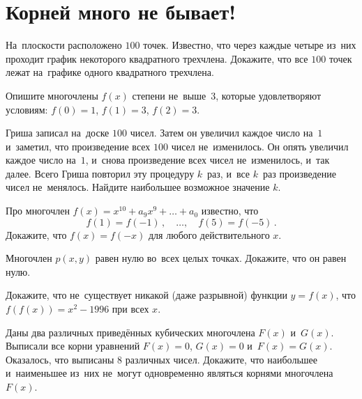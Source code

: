 
\section*{Корней много не бывает!}


\begin{problems}

\item
На~плоскости расположено $100$ точек.
Известно, что через каждые четыре из~них проходит график некоторого квадратного
трехчлена.
Докажите, что все $100$ точек лежат на~графике одного квадратного трехчлена.

\item
Опишите многочлены $f(x)$ степени не~выше~$3$, которые удовлетворяют условиям:
$f(0) = 1$, $f(1) = 3$, $f(2) = 3$.

\item
Гриша записал на~доске $100$ чисел.
Затем он увеличил каждое число на~$1$ и~заметил, что произведение всех $100$
чисел не~изменилось.
Он опять увеличил каждое число на~$1$, и~снова произведение всех чисел
не~изменилось, и~так далее.
Всего Гриша повторил эту процедуру $k$~раз, и~все $k$~раз произведение чисел
не~менялось.
Найдите наибольшее возможное значение $k$.

\item
Про многочлен $f(x) = x^{10} + a_9 x^9 + \ldots + a_0$ известно, что
\[
    f(1) = f(-1)
\, , \quad
    \ldots
, \quad
    f(5) = f(-5)
\, .\]
Докажите, что $f(x) = f(-x)$ для любого действительного $x$.

\item
Многочлен $p(x, y)$ равен нулю во~всех целых точках.
Докажите, что он равен нулю.

\item
Докажите, что не~существует никакой (даже разрывной) функции $y = f(x)$,  что
$f(f(x)) = x^2 - 1996$ при всех $x$.

\item
Даны два различных приведённых кубических многочлена $F(x)$ и~$G(x)$.
Выписали все корни уравнений $F(x) = 0$, $G(x) = 0$ и~$F(x) = G(x)$.
Оказалось, что выписаны $8$ различных чисел.
Докажите, что наибольшее и~наименьшее из~них не~могут одновременно являться
корнями многочлена $F(x)$.

\end{problems}

